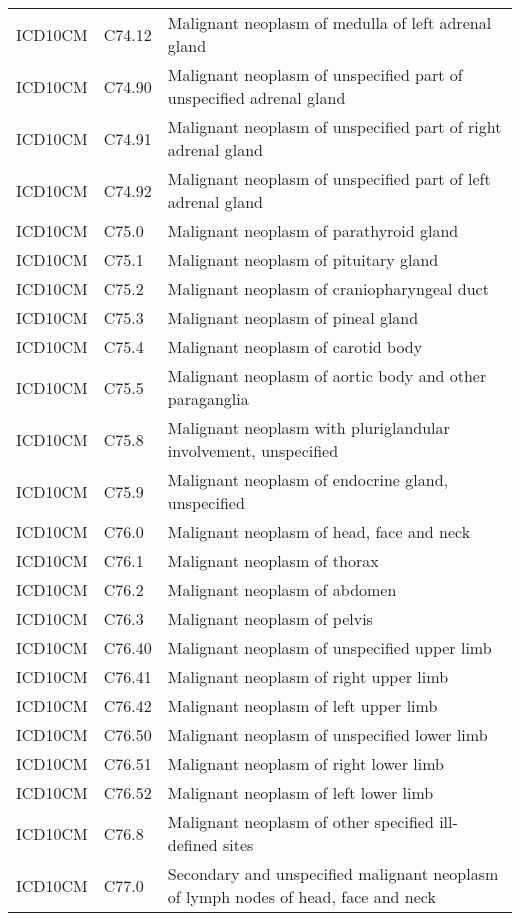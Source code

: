\begin{longtable}{p{}p{}p{}}
  ICD10CM & C74.12 & Malignant neoplasm of medulla of left adrenal gland \\ 
  ICD10CM & C74.90 & Malignant neoplasm of unspecified part of unspecified adrenal gland \\ 
  ICD10CM & C74.91 & Malignant neoplasm of unspecified part of right adrenal gland \\ 
  ICD10CM & C74.92 & Malignant neoplasm of unspecified part of left adrenal gland \\ 
  ICD10CM & C75.0 & Malignant neoplasm of parathyroid gland \\ 
  ICD10CM & C75.1 & Malignant neoplasm of pituitary gland \\ 
  ICD10CM & C75.2 & Malignant neoplasm of craniopharyngeal duct \\ 
  ICD10CM & C75.3 & Malignant neoplasm of pineal gland \\ 
  ICD10CM & C75.4 & Malignant neoplasm of carotid body \\ 
  ICD10CM & C75.5 & Malignant neoplasm of aortic body and other paraganglia \\ 
  ICD10CM & C75.8 & Malignant neoplasm with pluriglandular involvement, unspecified \\ 
  ICD10CM & C75.9 & Malignant neoplasm of endocrine gland, unspecified \\ 
  ICD10CM & C76.0 & Malignant neoplasm of head, face and neck \\ 
  ICD10CM & C76.1 & Malignant neoplasm of thorax \\ 
  ICD10CM & C76.2 & Malignant neoplasm of abdomen \\ 
  ICD10CM & C76.3 & Malignant neoplasm of pelvis \\ 
  ICD10CM & C76.40 & Malignant neoplasm of unspecified upper limb \\ 
  ICD10CM & C76.41 & Malignant neoplasm of right upper limb \\ 
  ICD10CM & C76.42 & Malignant neoplasm of left upper limb \\ 
  ICD10CM & C76.50 & Malignant neoplasm of unspecified lower limb \\ 
  ICD10CM & C76.51 & Malignant neoplasm of right lower limb \\ 
  ICD10CM & C76.52 & Malignant neoplasm of left lower limb \\ 
  ICD10CM & C76.8 & Malignant neoplasm of other specified ill-defined sites \\ 
  ICD10CM & C77.0 & Secondary and unspecified malignant neoplasm of lymph nodes of head, face and neck \\ 

\end{longtable}
